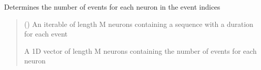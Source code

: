 \documentclass[letterpaper,10pt,english]{sphinxmanual}
\begin{document}
\begin{fulllineitems}
\label{\detokenize{CalSciPy.event_processing:CalSciPy.event_processing.get_num_events}}
\pysigstartsignatures
{}
\pysigstopsignatures
\sphinxAtStartPar
Determines the number of events for each neuron in the event indices
\begin{quote}\begin{description}
\sphinxAtStartPar
{} (\sphinxstyleliteralemphasis{\sphinxupquote{{[}}}\sphinxstyleliteralemphasis{\sphinxupquote{{[}}}\sphinxstyleliteralemphasis{\sphinxupquote{{]}}}\sphinxstyleliteralemphasis{\sphinxupquote{{]}}}) \textendash{} An iterable of length M neurons containing a sequence with a duration for each event

\sphinxAtStartPar
A 1\sphinxhyphen{}D vector of length M neurons containing the number of events for each neuron

\sphinxAtStartPar
{}

\end{description}\end{quote}

\end{fulllineitems}

\end{document}
